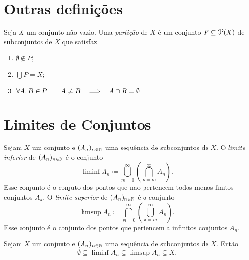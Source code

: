 \section{Outras definições}



\begin{defi}
	Seja $X$ um conjunto não vazio. Uma \emph{partição} de $X$ é um conjunto $P \subseteq \p(X)$ de subconjuntos de $X$ que satisfaz
	\begin{enumerate}
	\item $\emptyset \notin P$;
	\item $\displaystyle\bigcup P = X$;
	\item $\forall A,B \in P \qquad A \neq B \quad \Longrightarrow \quad A \cap B = \emptyset$.
	\end{enumerate}
\end{defi}

\section{Limites de Conjuntos}

\begin{defi}
	Sejam $X$ um conjunto e $(A_n)_{n \in \mathbb{N}}$ uma sequência de subconjuntos de $X$. O \emph{limite inferior} de $(A_n)_{n \in \mathbb{N}}$ é o conjunto
	\begin{equation*}
	\liminf A_n \coloneqq \bigcup_{m=0}^\infty \left( \bigcap_{n=m}^\infty A_n \right).
	\end{equation*}
	Esse conjunto é o conjuto dos pontos que não pertencem todos menos finitos conjuntos $A_n$.
O \emph{limite superior} de $(A_n)_{n \in \mathbb{N}}$ é o conjunto
	\begin{equation*}
	\limsup A_n \coloneqq \bigcap_{m=0}^\infty \left( \bigcup_{n=m}^\infty A_n \right).
	\end{equation*}
	Esse conjunto é o conjunto dos pontos que pertencem a infinitos conjuntos $A_n$.
\end{defi}

\begin{prop}
	Sejam $X$ um conjunto e $(A_n)_{n \in \mathbb{N}}$ uma sequência de subconjuntos de $X$. Então
	\begin{equation*}
	\emptyset \subseteq \liminf A_n \subseteq \limsup A_n \subseteq X.
	\end{equation*}
\end{prop}

